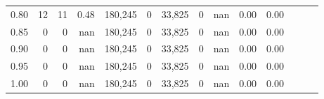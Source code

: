 \begin{tabular}{rrrrrrrrrrrrrr}
0.80 &      12 &     11 &  0.48 &  180,245 &        0 &  33,825 &       0 &   nan &  0.00 &      0.00 \\
0.85 &       0 &      0 &   nan &  180,245 &        0 &  33,825 &       0 &   nan &  0.00 &      0.00 \\
0.90 &       0 &      0 &   nan &  180,245 &        0 &  33,825 &       0 &   nan &  0.00 &      0.00 \\
0.95 &       0 &      0 &   nan &  180,245 &        0 &  33,825 &       0 &   nan &  0.00 &      0.00 \\
1.00 &       0 &      0 &   nan &  180,245 &        0 &  33,825 &       0 &   nan &  0.00 &      0.00 \\
\bottomrule
\end{tabular}
